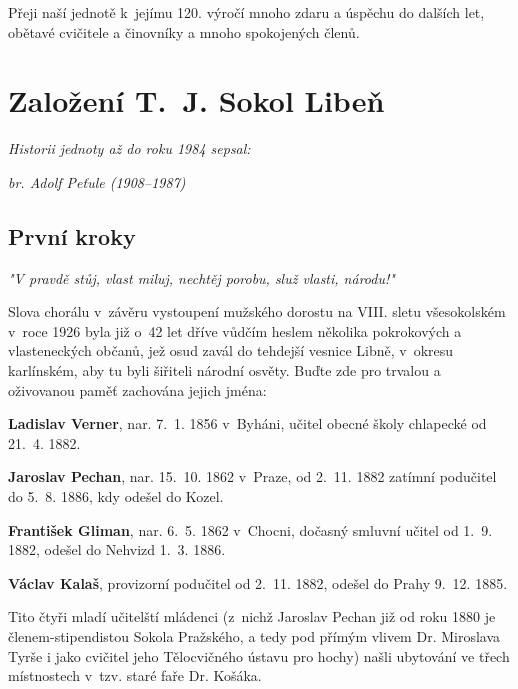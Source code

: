 \documentclass[a5paper, 11pt, twoside]{article}
\begin{document}
Přeji naší jednotě k~jejímu 120. výročí mnoho zdaru a úspěchu do dalších
let, obětavé cvičitele a činovníky a mnoho spokojených členů.

\clearpage

\section{Založení T.~J. Sokol Libeň}
\begin{center}
  \textit{Historii jednoty až do roku 1984 sepsal:}
  
  \textit{br. Adolf Peťule (1908–1987)}
\end{center}

\subsection{První kroky}

\vspace{6pt}
\begin{center}
  \textit{"V pravdě stůj, vlast miluj, nechtěj porobu, služ vlasti, národu!"}%
\end{center}

\noindent Slova chorálu v~závěru vystoupení mužského dorostu na VIII. sletu
všesokolském v~roce 1926 byla již o~42 let dříve vůdčím heslem několika
pokrokových a vlasteneckých občanů, jež osud zavál do tehdejší vesnice
Libně, v~okresu karlínském, aby tu byli šiřiteli národní osvěty. Buďte
zde pro trvalou a oživovanou paměť zachována jejich jména:

\smallskip
\textbf{Ladislav Verner}, nar. 7.~1. 1856 v~Byháni, učitel obecné školy chlapecké od 21.~4. 1882.

\textbf{Jaroslav Pechan}, nar. 15.~10. 1862 v~Praze, od 2.~11. 1882 zatímní podučitel do 5.~8. 1886, kdy odešel do Kozel.

\textbf{František Gliman}, nar. 6.~5. 1862 v~Chocni, dočasný smluvní učitel od 1.~9. 1882, odešel do Nehvizd 1.~3. 1886.

\textbf{Václav Kalaš}, provizorní podučitel od 2.~11. 1882, odešel do Prahy 9.~12. 1885.

\smallskip
Tito čtyři mladí učitelští mládenci (z~nichž Jaroslav Pechan již od roku
1880 je členem-stipendistou Sokola Pražského, a tedy pod přímým vlivem
Dr. Miroslava Tyrše i jako cvičitel jeho Tělocvičného ústavu pro hochy)
našli ubytování ve třech místnostech v~tzv. staré faře Dr. Košáka.
\end{document}

